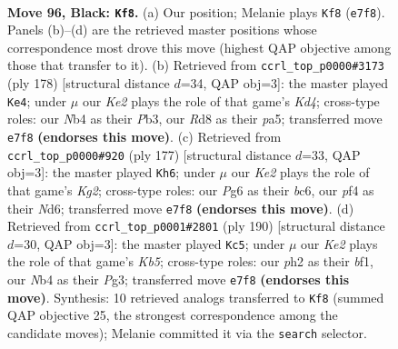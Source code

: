 \documentclass[11pt]{article}
\begin{document}
\clearpage

\begin{figure}[p]\centering
\begin{subfigure}{0.46\textwidth}\centering
\resizebox{\linewidth}{!}{%
\newchessgame
\chessboard[
  setfen={3r4/4kp2/6p1/4P3/bnB2Ppp/1N6/5K1P/8 b - - 7 96},
  showmover=false,
  pgfstyle=straightmove, color=movearrow, markmove={e7-f8}
]}
\caption{}
\end{subfigure}\hfill
\begin{subfigure}{0.46\textwidth}\centering
\resizebox{\linewidth}{!}{%
\newchessgame
\chessboard[
  setfen={8/2p4k/1n1p4/p2P2PB/1p1K4/1P6/P7/8 w - - 5 90},
  showmover=false,
  pgfstyle=straightmove, color=movearrow, markmove={d4-e4}
]}
\caption{}
\end{subfigure}
\\[4pt]
\begin{subfigure}{0.46\textwidth}\centering
\resizebox{\linewidth}{!}{%
\newchessgame
\chessboard[
  setfen={8/6k1/2BnNpp1/7p/7P/r1BK2P1/8/8 b - - 45 89},
  showmover=false,
  pgfstyle=straightmove, color=movearrow, markmove={g7-h6}
]}
\caption{}
\end{subfigure}\hfill
\begin{subfigure}{0.46\textwidth}\centering
\resizebox{\linewidth}{!}{%
\newchessgame
\chessboard[
  setfen={1B6/1p6/4k1p1/PK2P2p/2p5/2P3P1/7P/5b2 w - - 79 96},
  showmover=false,
  pgfstyle=straightmove, color=movearrow, markmove={b5-c5}
]}
\caption{}
\end{subfigure}
\caption{\textbf{Move 96, Black: \texttt{Kf8}.} (a) Our position; Melanie plays \texttt{Kf8} (\texttt{e7f8}). Panels (b)--(d) are the retrieved master positions whose correspondence most drove this move (highest QAP objective among those that transfer to it). (b) Retrieved from \texttt{ccrl\_top\_p0000\#3173} (ply 178) [structural distance $d$=34, QAP obj=3]: the master played \texttt{Ke4}; under $\mu$ our \emph{Ke2} plays the role of that game's \emph{Kd4}; cross-type roles: our \emph{N}b4 as their \emph{P}b3, our \emph{R}d8 as their \emph{p}a5; transferred move \texttt{e7f8} \textbf{(endorses this move)}. (c) Retrieved from \texttt{ccrl\_top\_p0000\#920} (ply 177) [structural distance $d$=33, QAP obj=3]: the master played \texttt{Kh6}; under $\mu$ our \emph{Ke2} plays the role of that game's \emph{Kg2}; cross-type roles: our \emph{P}g6 as their \emph{b}c6, our \emph{p}f4 as their \emph{N}d6; transferred move \texttt{e7f8} \textbf{(endorses this move)}. (d) Retrieved from \texttt{ccrl\_top\_p0001\#2801} (ply 190) [structural distance $d$=30, QAP obj=3]: the master played \texttt{Kc5}; under $\mu$ our \emph{Ke2} plays the role of that game's \emph{Kb5}; cross-type roles: our \emph{p}h2 as their \emph{b}f1, our \emph{N}b4 as their \emph{P}g3; transferred move \texttt{e7f8} \textbf{(endorses this move)}. Synthesis: 10 retrieved analogs transferred to \texttt{Kf8} (summed QAP objective 25, the strongest correspondence among the candidate moves); Melanie committed it via the \texttt{search} selector.}
\label{fig:thought-m191}
\end{figure}
\end{document}
